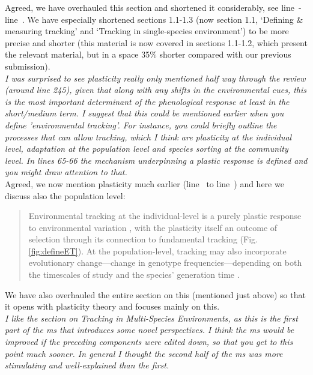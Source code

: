 \documentclass[11pt,letterpaper]{article}
\newcommand{\lr}[1]{line~\lineref{#1}}
\begin{document}
Agreed, we have overhauled this section and shortened it considerably, see \lr{plasS}-\lr{bhE}. We have especially shortened sections 1.1-1.3 (now section 1.1, `Defining \& measuring tracking' and `Tracking in single-species environment') to be more precise and shorter (this material is now covered in sections 1.1-1.2, which present the relevant material, but in a space 35\% shorter compared with our previous submission).\\

\emph{I was surprised to see plasticity really only mentioned half way through the review (around
line 245), given that along with any shifts in the environmental cues, this is the most
important determinant of the phenological response at least in the short/medium term. I
suggest that this could be mentioned earlier when you define 'environmental tracking'. For
instance, you could briefly outline the processes that can allow tracking, which I think are
plasticity at the individual level, adaptation at the population level and species sorting at
the community level.  In lines 65-66 the mechanism underpinning a plastic response is defined
and you might draw attention to that.}\\

Agreed, we now mention plasticity much earlier (\lr{Bminusbstart} to \lr{itsnotevo}) and here we discuss also the population level: 

\begin{quote}
 Environmental tracking at the individual-level is a purely plastic response to environmental variation \citep[in line with current findings on most climate change responses,][]{bonamour2019}, with the plasticity itself an outcome of selection \citep{chevin2010} through its connection to fundamental tracking (Fig. \ref{fig:defineET}). At the population-level, tracking may also incorporate evolutionary change---change in genotype frequencies---depending on both the timescales of study and the species' generation time \citep[this evolutionary response can be predicted as the difference between the environmental sensitivity of phenotypic selection and an organism's plasticity, $|B-b|$ in][]{chevin2010}.
\end{quote}
We have also overhauled the entire section on this (mentioned just above) so that it opens with plasticity theory and focuses mainly on this.\\

\emph{I like the section on Tracking in Multi-Species Environments, as this is the first part of
the ms that introduces some novel perspectives. I think the ms would be improved if the
preceding components were edited down, so that you get to this point much sooner. In general
I thought the second half of the ms was more stimulating and well-explained than the first.}\\
\end{document}
